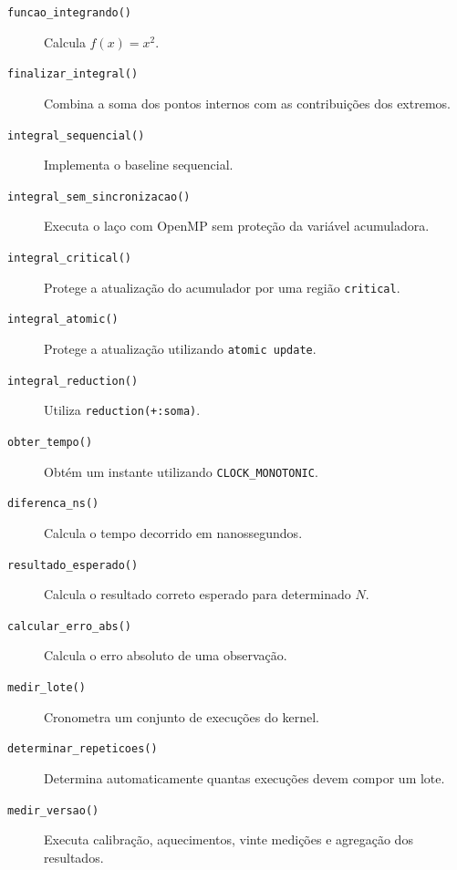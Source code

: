 \begin{description}

    \item[\texttt{funcao\_integrando()}]
    Calcula \(f(x)=x^2\).

    \item[\texttt{finalizar\_integral()}]
    Combina a soma dos pontos internos com as contribuições dos extremos.

    \item[\texttt{integral\_sequencial()}]
    Implementa o baseline sequencial.

    \item[\texttt{integral\_sem\_sincronizacao()}]
    Executa o laço com OpenMP sem proteção da variável acumuladora.

    \item[\texttt{integral\_critical()}]
    Protege a atualização do acumulador por uma região
    \texttt{critical}.

    \item[\texttt{integral\_atomic()}]
    Protege a atualização utilizando \texttt{atomic update}.

    \item[\texttt{integral\_reduction()}]
    Utiliza \texttt{reduction(+:soma)}.

    \item[\texttt{obter\_tempo()}]
    Obtém um instante utilizando \texttt{CLOCK\_MONOTONIC}.

    \item[\texttt{diferenca\_ns()}]
    Calcula o tempo decorrido em nanossegundos.

    \item[\texttt{resultado\_esperado()}]
    Calcula o resultado correto esperado para determinado \(N\).

    \item[\texttt{calcular\_erro\_abs()}]
    Calcula o erro absoluto de uma observação.

    \item[\texttt{medir\_lote()}]
    Cronometra um conjunto de execuções do kernel.

    \item[\texttt{determinar\_repeticoes()}]
    Determina automaticamente quantas execuções devem compor um lote.

    \item[\texttt{medir\_versao()}]
    Executa calibração, aquecimentos, vinte medições e agregação dos
    resultados.

\end{description}


